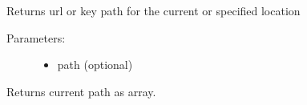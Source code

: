 \documentclass[letterpaper,10pt,english]{sphinxmanual}
\begin{document}
\begin{fulllineitems}
\begin{fulllineitems}
\begin{description}
\begin{itemize}
\end{itemize}

\end{description}

\end{fulllineitems}


\begin{fulllineitems}
\label{knop_nav:knop_nav.path}
\end{fulllineitems}


\begin{fulllineitems}
Returns url or key path for the current or specified location
\begin{description}
\item[{Parameters:}] \leavevmode\begin{itemize}
\item {} 
path (optional)

\end{itemize}

\end{description}

\end{fulllineitems}



\begin{fulllineitems}
\end{fulllineitems}


\begin{fulllineitems}
\label{knop_nav:knop_nav.pathargs}
\end{fulllineitems}



\begin{fulllineitems}
\end{fulllineitems}


\begin{fulllineitems}
\label{knop_nav:knop_nav.patharray}
Returns current path as array.


\end{fulllineitems}
\end{fulllineitems}
\end{document}
